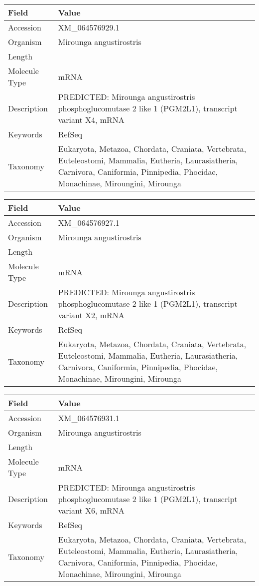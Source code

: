 \documentclass[10pt]{article}
\begin{document}
\vspace{1em}
{\footnotesize
\begin{longtable}{>{\raggedright\arraybackslash}p{4.5cm} >{\raggedright\arraybackslash}p{11.5cm}}
\textbf{Field} & \textbf{Value} \\
\hline
Accession & XM\_064576929.1 \\
Organism & Mirounga angustirostris \\
Length & 7948 \\
Molecule Type & mRNA \\
Description & PREDICTED: Mirounga angustirostris phosphoglucomutase 2 like 1 (PGM2L1), transcript variant X4, mRNA \\
Keywords & RefSeq \\
Taxonomy & Eukaryota, Metazoa, Chordata, Craniata, Vertebrata, Euteleostomi, Mammalia, Eutheria, Laurasiatheria, Carnivora, Caniformia, Pinnipedia, Phocidae, Monachinae, Miroungini, Mirounga \\
\end{longtable}
}

\vspace{1em}
{\footnotesize
\begin{longtable}{>{\raggedright\arraybackslash}p{4.5cm} >{\raggedright\arraybackslash}p{11.5cm}}
\textbf{Field} & \textbf{Value} \\
\hline
Accession & XM\_064576927.1 \\
Organism & Mirounga angustirostris \\
Length & 8127 \\
Molecule Type & mRNA \\
Description & PREDICTED: Mirounga angustirostris phosphoglucomutase 2 like 1 (PGM2L1), transcript variant X2, mRNA \\
Keywords & RefSeq \\
Taxonomy & Eukaryota, Metazoa, Chordata, Craniata, Vertebrata, Euteleostomi, Mammalia, Eutheria, Laurasiatheria, Carnivora, Caniformia, Pinnipedia, Phocidae, Monachinae, Miroungini, Mirounga \\
\end{longtable}
}

\vspace{1em}
{\footnotesize
\begin{longtable}{>{\raggedright\arraybackslash}p{4.5cm} >{\raggedright\arraybackslash}p{11.5cm}}
\textbf{Field} & \textbf{Value} \\
\hline
Accession & XM\_064576931.1 \\
Organism & Mirounga angustirostris \\
Length & 8156 \\
Molecule Type & mRNA \\
Description & PREDICTED: Mirounga angustirostris phosphoglucomutase 2 like 1 (PGM2L1), transcript variant X6, mRNA \\
Keywords & RefSeq \\
Taxonomy & Eukaryota, Metazoa, Chordata, Craniata, Vertebrata, Euteleostomi, Mammalia, Eutheria, Laurasiatheria, Carnivora, Caniformia, Pinnipedia, Phocidae, Monachinae, Miroungini, Mirounga \\
\end{longtable}
}
\end{document}
